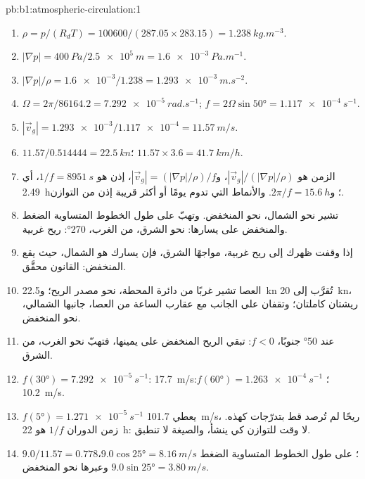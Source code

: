 \begin{solution}{pb:b1:atmospheric-circulation:1}
\begin{enumerate}
  \item $\rho = p/(R_dT) = \num{100600}/(287.05 \times 283.15) =
        \qty{1.238}{kg.m^{-3}}$.
  \item $|\nabla p| = \qty{400}{Pa}/\qty{2.5e5}{m} = \qty{1.6e-3}{Pa.m^{-1}}$.
  \item $|\nabla p|/\rho = \num{1.6e-3}/1.238 = \qty{1.293e-3}{m.s^{-2}}$.
  \item $\Omega = 2\pi/\num{86164.2} = \qty{7.292e-5}{rad.s^{-1}}$;
        $f = 2\Omega\sin\ang{50} = \qty{1.117e-4}{s^{-1}}$.
  \item $|\vec v_g| = \num{1.293e-3}/\num{1.117e-4} = \qty{11.57}{m/s}$.
  \item $11.57/0.514444 = \qty{22.5}{kn}$؛ $11.57 \times 3.6 = \qty{41.7}{km/h}$.
  \item الزمن هو $|\vec v_g|/(|\nabla p|/\rho)$، و$|\vec v_g| = (|\nabla
        p|/\rho)/f$، إذن هو $1/f = \qty{8951}{s}$، أي \qty{2.49}{h}؛ و$2\pi/f =
        \qty{15.6}{h}$. والأنماط التي تدوم يومًا أو أكثر قريبة إذن من التوازن.
  \item تشير  نحو الشمال، نحو المنخفض. وتهبّ  على طول الخطوط المتساوية الضغط والمنخفض على يسارها: نحو الشرق، من الغرب،  \ang{270}: ريح غربية.
  \item إذا وقفت ظهرك إلى ريح غربية، مواجهًا الشرق، فإن يسارك هو الشمال، حيث يقع المنخفض: القانون محقَّق.
  \item العصا تشير غربًا من دائرة المحطة، نحو مصدر الريح؛ و\qty{22.5}{kn} تُقرَّب إلى \qty{20}{kn}، ريشتان كاملتان؛ وتقفان على الجانب مع عقارب الساعة من العصا، جانبها الشمالي، نحو المنخفض.
  \item عند \ang{50} جنوبًا، $f < 0$: تبقي الريح المنخفض على يمينها، فتهبّ نحو الغرب، من الشرق.
  \item $f(\ang{30}) = \qty{7.292e-5}{s^{-1}}$: \qty{17.7}{m/s}؛ $f(\ang{60}) =
        \qty{1.263e-4}{s^{-1}}$: \qty{10.2}{m/s}.
  \item $f(\ang{5}) = \qty{1.271e-5}{s^{-1}}$ يعطي \qty{101.7}{m/s}، ريحًا لم تُرصد قط بتدرّجات كهذه. زمن الدوران $1/f$ هو \qty{22}{h}: لا وقت للتوازن كي ينشأ، والصيغة لا تنطبق.
  \item $9.0/11.57 = 0.778$؛ على طول الخطوط المتساوية الضغط $9.0\cos\ang{25} = \qty{8.16}{m/s}$،
        وعبرها نحو المنخفض $9.0\sin\ang{25} = \qty{3.80}{m/s}$.

\end{enumerate}
\end{solution}

